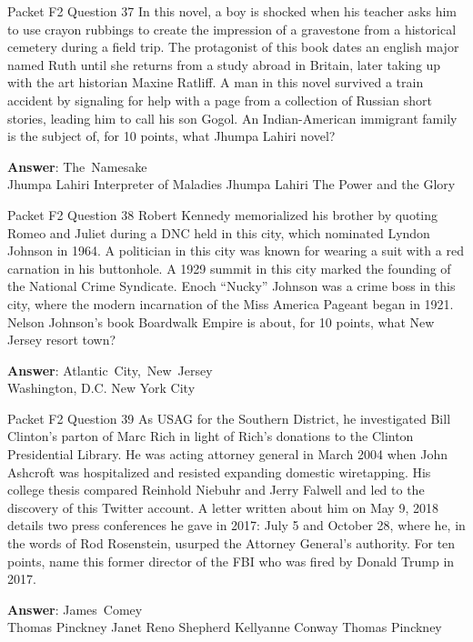 \begin{frame}{Packet F2 Question 37}
In this novel, a boy is shocked when his teacher asks him to use crayon rubbings to create the impression of a gravestone from a historical cemetery during a field trip. The protagonist of this book dates an english major named Ruth until she returns from a study abroad in Britain, later taking up with the art historian Maxine Ratliff. A man in this novel survived a train accident by signaling for help   with a page from a collection of Russian short stories, leading him to call his son Gogol. An Indian-American   immigrant family is the subject of, for 10 points, what Jhumpa Lahiri novel?      

\textbf{Answer}: The\ Namesake\\
 Jhumpa Lahiri
 Interpreter of Maladies
 Jhumpa Lahiri
 The Power and the Glory
\end{frame}

\begin{frame}{Packet F2 Question 38}
Robert Kennedy memorialized his brother by quoting Romeo and Juliet during a DNC held in this city, which nominated Lyndon Johnson in 1964. A politician in this city was known for wearing a suit with a red carnation in his buttonhole. A 1929 summit in this city marked the founding of the National Crime Syndicate. Enoch “Nucky” Johnson was a crime boss in this city, where the modern incarnation of the Miss America Pageant began in 1921. Nelson Johnson’s book Boardwalk Empire is about, for 10 points, what New Jersey resort     town?    

\textbf{Answer}: Atlantic\ City,\ New\ Jersey\\
 Washington, D.C.
 New York City
\end{frame}

\begin{frame}{Packet F2 Question 39}
As USAG for the Southern District, he investigated   Bill Clinton's parton of Marc Rich in light of Rich's donations to the Clinton Presidential Library.  He was acting attorney general in March 2004 when John Ashcroft was hospitalized and resisted expanding domestic wiretapping.  His college thesis compared Reinhold Niebuhr and Jerry Falwell and led to the discovery of this Twitter account.  A letter written about him on May 9, 2018 details two press conferences he gave in 2017: July 5 and October 28, where he, in the words of Rod Rosenstein, usurped the Attorney General's authority.  For ten points, name this former director of the FBI who was fired by Donald Trump in 2017.        

\textbf{Answer}: James\ Comey\\
 Thomas Pinckney
 Janet Reno
 Shepherd
 Kellyanne Conway
 Thomas Pinckney
\end{frame}

